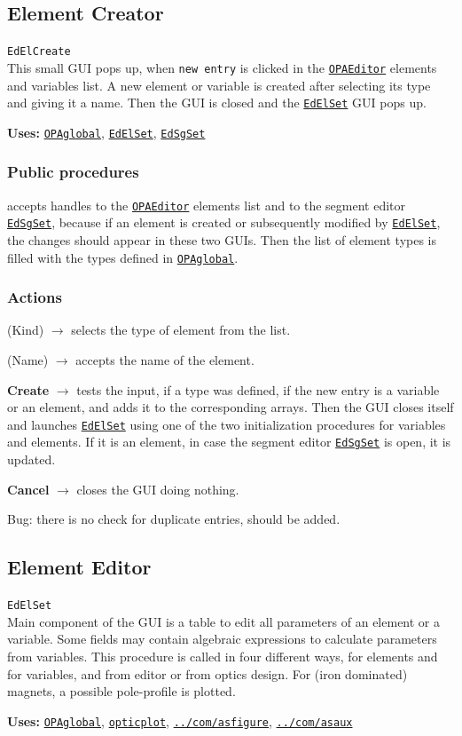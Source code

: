 \documentclass[12pt]{article}
\newcommand\code[1]{{\tt #1}}
\newcommand{\ofld}[1]{\colorbox{black!15}{{\bf #1}}}
\newcommand{\ofldx}[1]{\colorbox{black!15}{(#1)}}
\newcommand\guico[1]{{\color{blue}\code{#1}}}
\newcommand{\evcod}[2]{\ofld{#1} $\rightarrow$ \guico{#2}}
\newcommand{\evcodx}[2]{\ofldx{#1} $\rightarrow$ \guico{#2}}
\newcommand{\opagui}[1]{\colorbox{blue!20}{\code{#1}}}
\newcommand{\oguih}[2]{\subsection{\label{#2}#1}{\Huge\opagui{#2}}\\}
\newcommand{\ogui}[1]{\hyperref[#1]{\opagui{#1}}}
\newcommand{\opaguif}[1]{\colorbox{violet!30}{\code{#1}}}
\newcommand{\oguif}[1]{\hyperref[#1]{\opaguif{#1}}}
\newcommand{\opauni}[1]{\colorbox{orange!30}{\code{#1}}}
\newcommand{\ouni}[1]{\hyperref[#1]{\opauni{#1}}}
\newcommand{\uses}[1]{{\bf Uses: } #1}
\newcommand{\desc}[1]{#1}
\newcommand{\act}[1]{\subsubsection*{Actions} #1}
\newcommand{\ppro}[1]{\subsubsection*{Public procedures} #1}
\newcommand{\todo}[1]{{\color{red} #1}}
\begin{document}
\oguih{Element Creator}{EdElCreate} 

\desc{This small GUI pops up, when \code{new entry} is clicked in the \ouni{OPAEditor} elements and variables list. A new element or variable is created after selecting its type and giving it a name. Then the GUI is closed and the \ogui{EdElSet} GUI pops up.}

\uses{\ouni{OPAglobal}, \ogui{EdElSet}, \ogui{EdSgSet} }   
\ppro{
\guico{Init} accepts handles to the \ogui{OPAEditor} elements list and to the segment editor \ouni{EdSgSet}, because if an element is created or subsequently modified by \ogui{EdElSet}, the changes should appear in these two GUIs. Then the list of element types is filled with the types defined in \ouni{OPAglobal}.
}

\act{
\evcodx{Kind}{ComETypeChange} selects the type of element from the list.

\evcodx{Name}{EdENameChange} accepts the name of the element.

\evcod{Create}{ButCreClick} tests the input, if a type was defined, if the new entry is a variable or an element, and adds it to the corresponding arrays. Then the GUI closes itself and launches \ogui{EdElSet} using one of the two initialization procedures for variables and elements. If it is an element, in case  the segment editor \ogui{EdSgSet} is open, it is updated.

\evcod{Cancel}{ButCanClick} closes the GUI doing nothing.
}

\todo{Bug: there is no check for duplicate entries, should be added.}


\oguih{Element Editor}{EdElSet} 

\desc{
Main component of the GUI is a table to edit all parameters of an element or a variable. Some fields may contain algebraic expressions to calculate parameters from variables. This procedure is called in four different ways, for elements and for variables, and from editor or from optics design. For (iron dominated) magnets, a possible pole-profile is plotted.
}

\uses{\ouni{OPAglobal}, \ouni{opticplot}, \oguif{../com/asfigure}, \ouni{../com/asaux}}
\end{document}
